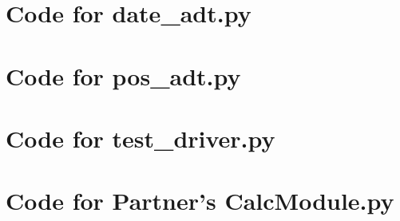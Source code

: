 \documentclass[12pt]{article}
\begin{document}
\section{Code for date\_adt.py}

\noindent 

\newpage

\section{Code for pos\_adt.py}

\noindent 

\newpage

\section{Code for test\_driver.py}

\noindent 

\newpage

\section{Code for Partner's CalcModule.py}

\noindent 
\end{document}
